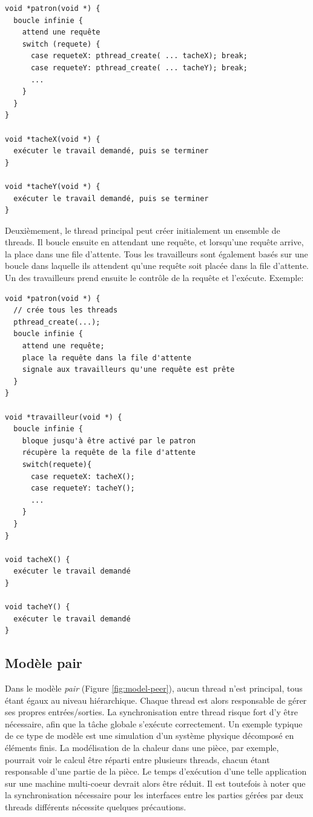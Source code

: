 \begin{lstlisting}[frame=trBL]
void *patron(void *) {
  boucle infinie {
    attend une requête
    switch (requete) {
      case requeteX: pthread_create( ... tacheX); break;
      case requeteY: pthread_create( ... tacheY); break;
      ...
    }
  }
}

void *tacheX(void *) {
  exécuter le travail demandé, puis se terminer
}

void *tacheY(void *) {
  exécuter le travail demandé, puis se terminer
}
\end{lstlisting}

Deuxièmement, le thread principal peut créer initialement un ensemble de threads. Il boucle ensuite en attendant une requête, et lorsqu'une requête arrive, la place dans une file d'attente. Tous les travailleurs sont également basés sur une boucle dans laquelle ils attendent qu'une requête soit placée dans la file d'attente. Un des travailleurs prend ensuite le contrôle de la requête et l'exécute.
\newpage
Exemple:

\begin{lstlisting}[frame=trBL]
void *patron(void *) {
  // crée tous les threads
  pthread_create(...);
  boucle infinie {
    attend une requête;
    place la requête dans la file d'attente
    signale aux travailleurs qu'une requête est prête
  }
}

void *travailleur(void *) {
  boucle infinie {
    bloque jusqu'à être activé par le patron
    récupère la requête de la file d'attente
    switch(requete){
      case requeteX: tacheX();
      case requeteY: tacheY();
      ...
    }
  }
}

void tacheX() {
  exécuter le travail demandé
}

void tacheY() {
  exécuter le travail demandé
}
\end{lstlisting}

\subsection{Modèle pair}

Dans le modèle \emph{pair} (Figure \ref{fig:model-peer}), aucun thread n'est principal, tous étant égaux au niveau hiérarchique. Chaque thread est alors responsable de gérer ses propres entrées/sorties. La synchronisation entre thread risque fort d'y être nécessaire, afin que la tâche globale s'exécute correctement. Un exemple typique de ce type de modèle est une simulation d'un système physique décomposé en éléments finis. La modélisation de la chaleur dans une pièce, par exemple, pourrait voir le calcul être réparti entre plusieurs threads, chacun étant responsable d'une partie de la pièce. Le temps d'exécution d'une telle application sur une machine multi-coeur devrait alors être réduit. Il est toutefois à noter que la synchronisation nécessaire pour les interfaces entre les parties gérées par deux threads différents nécessite quelques précautions.


